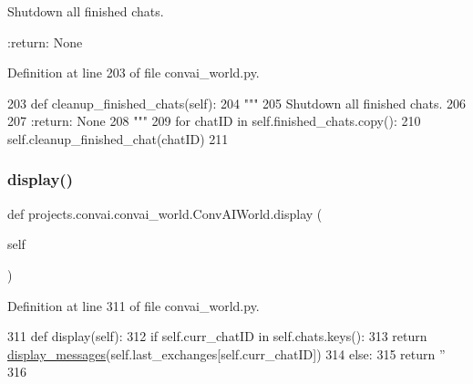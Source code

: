 \begin{DoxyVerb}Shutdown all finished chats.

:return: None
\end{DoxyVerb}
 

Definition at line 203 of file convai\+\_\+world.\+py.


\begin{DoxyCode}
203     \textcolor{keyword}{def }cleanup\_finished\_chats(self):
204         \textcolor{stringliteral}{"""}
205 \textcolor{stringliteral}{        Shutdown all finished chats.}
206 \textcolor{stringliteral}{}
207 \textcolor{stringliteral}{        :return: None}
208 \textcolor{stringliteral}{        """}
209         \textcolor{keywordflow}{for} chatID \textcolor{keywordflow}{in} self.finished\_chats.copy():
210             self.cleanup\_finished\_chat(chatID)
211 
\end{DoxyCode}
\mbox{\label{classprojects_1_1convai_1_1convai__world_1_1ConvAIWorld_a0fab2b57d8eb4f4e9329c43d9a223ff4}} 
\subsubsection{\texorpdfstring{display()}{display()}}
{\footnotesize\ttfamily def projects.\+convai.\+convai\+\_\+world.\+Conv\+A\+I\+World.\+display (\begin{DoxyParamCaption}\item[{}]{self }\end{DoxyParamCaption})}



Definition at line 311 of file convai\+\_\+world.\+py.


\begin{DoxyCode}
311     \textcolor{keyword}{def }display(self):
312         \textcolor{keywordflow}{if} self.curr\_chatID \textcolor{keywordflow}{in} self.chats.keys():
313             \textcolor{keywordflow}{return} \hyperlink{namespaceparlai_1_1utils_1_1misc_a146f303a4c4b34993458968c74b55d2f}{display\_messages}(self.last\_exchanges[self.curr\_chatID])
314         \textcolor{keywordflow}{else}:
315             \textcolor{keywordflow}{return} \textcolor{stringliteral}{''}
316 
\end{DoxyCode}
\mbox{\label{classprojects_1_1convai_1_1convai__world_1_1ConvAIWorld_a1c2a2ebebc08b1283d51defc4e4406cf}} 
